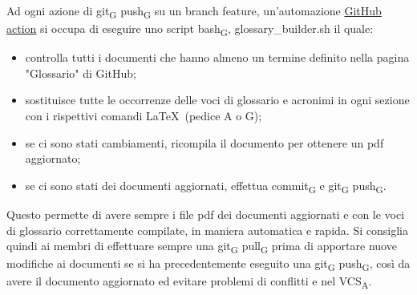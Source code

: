     Ad ogni azione di git\textsubscript{G} push\textsubscript{G} su un branch feature, un'automazione \href{https://docs.github.com/en/free-pro-team@latest/actions}{GitHub action} si occupa di eseguire uno script bash\textsubscript{G}, glossary\_builder.sh il quale:
    \begin{itemize}
        \item controlla tutti i documenti che hanno almeno un termine definito nella pagina "Glossario" di GitHub;
        \item sostituisce tutte le occorrenze delle voci di glossario e acronimi in ogni sezione con i rispettivi comandi \LaTeX{}\ (pedice A o G);
        \item se ci sono stati cambiamenti, ricompila il documento per ottenere un pdf aggiornato;
        \item se ci sono stati dei documenti aggiornati, effettua commit\textsubscript{G} e git\textsubscript{G} push\textsubscript{G}.
    \end{itemize}
    Questo permette di avere sempre i file pdf dei documenti aggiornati e con le voci di glossario correttamente compilate, in maniera automatica e rapida. Si consiglia quindi ai membri di effettuare sempre una git\textsubscript{G} pull\textsubscript{G} prima di apportare nuove modifiche ai documenti se si ha precedentemente eseguito una git\textsubscript{G} push\textsubscript{G}, così da avere il documento aggiornato ed evitare problemi di conflitti e nel VCS\textsubscript{A}.
